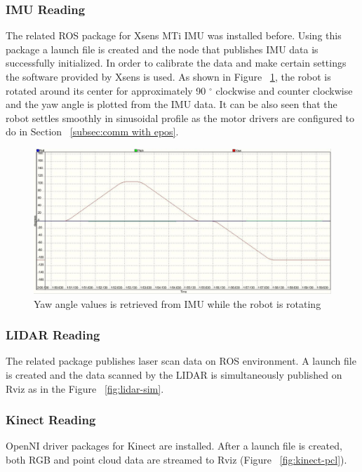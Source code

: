 		\subsubsection{IMU Reading}
		\label{subsec:imu reading}		
		The related ROS package for Xsens MTi IMU was installed before. Using this package a launch file is created and the node that publishes IMU data is successfully initialized. In order to calibrate the data and make certain settings the software provided by Xsens is used. As shown in Figure ~\ref{fig:xsens-test}, the robot is rotated around its center for approximately 90 $^{\circ}$ clockwise and counter clockwise and the yaw angle is plotted from the IMU data. It can be also seen that the robot settles smoothly in sinusoidal profile as the motor drivers are configured to do in Section ~\ref{subsec:comm with epos}.
		\begin{figure}[h]
			\centering
			\includegraphics[scale=0.4]{images/xsens-test}
			\caption{Yaw angle values is retrieved from IMU while the robot is rotating}
			\label{fig:xsens-test}
		\end{figure} 	
		\subsubsection{LIDAR Reading}
		\label{subsec:lidar reading}	
		The related package publishes laser scan data on ROS environment. A launch file is created and the data scanned by the LIDAR is simultaneously published on Rviz as in the Figure ~\ref{fig:lidar-sim}.	
		\subsubsection{Kinect Reading}
		\label{subsec:kinect reading}		
		OpenNI driver packages for Kinect are installed. After a launch file is created, both RGB and point cloud data are streamed to Rviz (Figure ~\ref{fig:kinect-pcl}).
		
